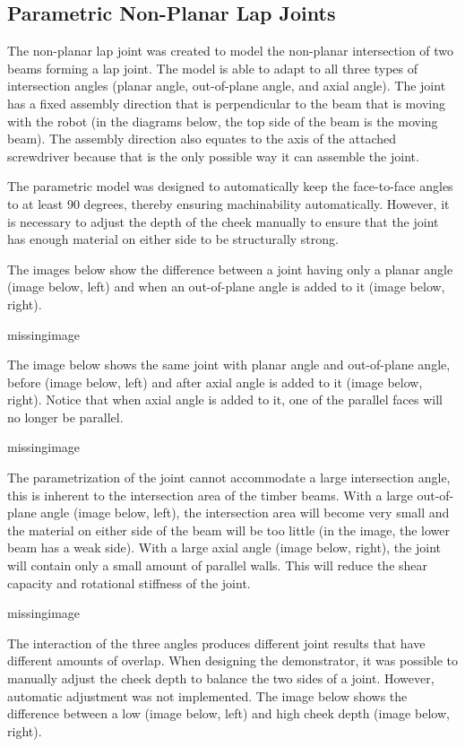\subsection{Parametric Non-Planar Lap Joints}
The non-planar lap joint was created to model the non-planar intersection of two beams forming a lap joint. The model is able to adapt to all three types of intersection angles (planar angle, out-of-plane angle, and axial angle). The joint has a fixed assembly direction that is perpendicular to the beam that is moving with the robot (in the diagrams below, the top side of the beam is the moving beam). The assembly direction also equates to the axis of the attached screwdriver because that is the only possible way it can assemble the joint.

The parametric model was designed to automatically keep the face-to-face angles to at least 90 degrees, thereby ensuring machinability automatically. However, it is necessary to adjust the depth of the cheek manually to ensure that the joint has enough material on either side to be structurally strong.

The images below show the difference between a joint having only a planar angle (image below, left) and when an out-of-plane angle is added to it (image below, right).

missingimage

The image below shows the same joint with planar angle and out-of-plane angle, before (image below, left) and after axial angle is added to it (image below, right). Notice that when axial angle is added to it, one of the parallel faces will no longer be parallel. 

missingimage

The parametrization of the joint cannot accommodate a large intersection angle, this is inherent to the intersection area of the timber beams. With a large out-of-plane angle (image below, left), the intersection area will become very small and the material on either side of the beam will be too little (in the image, the lower beam has a weak side). With a large axial angle (image below, right), the joint will contain only a small amount of parallel walls. This will reduce the shear capacity and rotational stiffness of the joint.

missingimage

The interaction of the three angles produces different joint results that have different amounts of overlap. When designing the demonstrator, it was possible to manually adjust the cheek depth to balance the two sides of a joint. However, automatic adjustment was not implemented. The image below shows the difference between a low (image below, left) and high cheek depth (image below, right).

